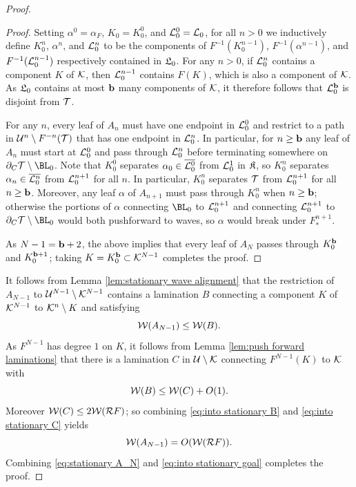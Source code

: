 \documentclass[12pt]{amsart}
\begin{document}
\begin{proof}
    \begin{proof}
        Setting $\alpha^0= \alpha_F$, $K_0 = K_0^0$, and  $\mathcal L_0^0 = \mathcal L_0$, for all $n> 0$ we inductively define $K_0^n$, $\alpha^n$, and $\mathcal L_0^n$ to be the components of $F^{-1}(K_0^{n-1})$, $F^{-1}(\alpha^{n-1})$, and $F^{-1}(\mathcal L_0^{n-1})$ respectively contained in $\mathfrak{L}_0$. 
	For any $n>0$, if $\mathcal L_0^n$ contains a component $K$ of $\mathcal K$, then $\mathcal L_0^{n-1}$ contains $F(K)$, which is also a component of $\mathcal K$. As $\mathfrak{L}_0$ contains at most $\mathbf b$ many components of $\mathcal K$, it therefore follows that $\mathcal L_{0}^{\mathbf b}$ is disjoint from $\mathcal T$.

    For any $n$, every leaf of $A_n$ must have one endpoint in $\mathcal L_0^0$ and restrict to a path in $\mathcal U^n\setminus F^{-n}(\mathcal T)$ that has one endpoint in $\mathcal L_0^n$. 
	In particular, for $n\geq \mathbf b$ any leaf of $A_n$ must start at $\mathcal L_0^0$ and pass through $\mathcal L_0^n$ before terminating somewhere on $\dcara\TT\sm \BL_0$.
	Note that $K_0^0$ separates $\alpha_0\in \overline{\mathcal L_0^0}$ from $\mathcal L_0^1$ in $\mathfrak{K}$, so $K_0^n$ separates $\alpha_n\in \overline {\mathcal L_0^n}$ from $\mathcal L_0^{n+1}$ for all $n$. In particular, $K_0^n$ separates $\mathcal T$ from $\mathcal L_0^{n+1}$ for all $n\geq \mathbf b$. 
	Moreover, any leaf $\alpha$ of $A_{n+1}$ must pass through $K_0^n$ when $n\geq \mathbf b$; otherwise the portions of $\alpha$ connecting $\BL_0$ to $\mathcal L_0^{n+1}$ and connecting $\mathcal L_0^{n+1}$ to $\dcara\TT\sm \BL_0$ would both pushforward to waves, so $\alpha$ would break under $F_*^{n+1}$. 

    As $N-1 = \mathbf b+2$, the above implies that every leaf of $A_{N}$ passes through $K_0^{\mathbf b}$ and $K_0^{\mathbf b+1}$; taking $K = K_0^\mathbf b\subset \mathcal K^{N-1}$ completes the proof.
    \end{proof}
    
	
	It follows from Lemma \ref{lem:stationary wave alignment} that the restriction of $A_{N-1}$ to $\mathcal U^{N-1}\setminus \mathcal K^{N-1}$ contains a lamination $B$ connecting a component $K$ of $\mathcal K^{N-1}$ to $\mathcal K^n\setminus K$ and satisfying 
	\begin{equation}\label{eq:into stationary B}
		\mathcal W(A_{N-1})\leq \mathcal W(B).
	\end{equation}
	As $F^{N-1}$ has degree $1$ on $K$,  it follows from Lemma \ref{lem:push forward laminations} that there is a lamination $C$ in $\mathcal U\setminus \mathcal K$ connecting $F^{N-1}(K)$ to $\mathcal K$ with 
	\begin{equation}\label{eq:into stationary C}
		\mathcal W(B)\leq \mathcal W(C)+O(1).
	\end{equation}
	Moreover $\mathcal W(C)\leq 2\mathcal W(\mathcal R F)$; 
    so combining \eqref{eq:into stationary B} and \eqref{eq:into stationary C} yields 
    \begin{equation}\label{eq:into stationary goal}
		\mathcal W(A_{N-1})= O(\mathcal W(\mathcal R F)).
	\end{equation}
    Combining \eqref{eq:stationary A_N} and \eqref{eq:into stationary goal} completes the proof.
\end{proof}
\end{document}
